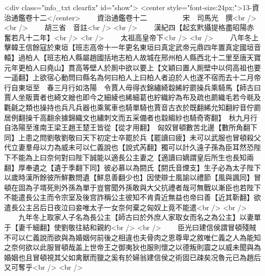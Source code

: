 <div class="info_txt clearfix" id="show">
<center style="font-size:24px;">13-資治通鑑卷十二</center>
  　　資治通鑑卷十二　　　　　宋　司馬光　撰<br />
<br />
　　胡三省　音註<br />
<br />
　　漢紀四【起玄黓攝提格盡昭陽赤奮若凡十二年】<br />
<br />
　　太祖高皇帝下<br />
<br />
　　八年冬上擊韓王信餘寇於東垣【班志高帝十一年更名東垣曰真定武帝元鼎四年置真定國垣音轅】過柏人【班志柏人縣屬趙國括地志柏人故城在邢州柏人縣西北十二里至唐天寶元年更柏人曰堯山】貫高等壁人於厠中欲以要上【文穎曰置人厠壁中以伺高祖也要一遥翻】上欲宿心動問曰縣名為何曰柏人上曰柏人者迫於人也遂不宿而去十二月帝行自東垣至　春三月行如洛陽　令賈人毋得衣錦繡綺縠絺紵罽操兵乘騎馬【師古曰賈人坐販賣者也綺文繒也即今之細綾也絺細葛也紵織紵為布及疏也罽織毛若今毼及氍毹之類也操持也兵凡兵器也乘駕車也騎單騎也賈音古衣於既翻絺允知翻紵音佇罽居例翻操千高翻余據錦織文也繡刺文而五采備者也縠縐紗也騎奇寄翻】　秋九月行自洛陽至淮南王梁王趙王楚王皆從【從才用翻】　匈奴冒頓數苦北邊【數所角翻下同】上患之問劉敬劉敬曰天下初定士卒罷於兵【罷讀曰疲】未可以武服也冒頓殺父代立妻羣母以力為威未可以仁義說也【說式芮翻】獨可以計久遠子孫為臣耳然恐陛下不能為上曰奈何對曰陛下誠能以適長公主妻之【適讀曰嫡謂皇后所生也長知兩翻】厚奉遺之【遺于季翻下同】彼必慕以為閼氏【閼氏音煙支】生子必為太子陛下以歲時漢所餘彼所鮮數問遺【鮮息善翻少也】因使辯士風諭以禮節【風與諷同】冒頓在固為子壻死則外孫為單于豈嘗聞外孫敢與大父抗禮者哉可無戰以漸臣也若陛下不能遣長公主而令宗室及後宫詐稱公主彼知不肯貴近無益也帝曰善【近其靳翻】欲遣長公主呂后日夜泣曰妾唯太子一女奈何棄之匈奴上竟不能遣<br />
<br />
　　九年冬上取家人子名為長公主【師古曰於外庶人家取女而名之為公主】以妻單于【妻千細翻】使劉敬往結和親約<br />
<br />
　　臣光曰建信侯謂冒頓殘賊不可以仁義說而欲與為婚姻何前後之相違也夫骨肉之恩尊卑之敘唯仁義之人為能知之奈何欲以此服冒頓哉盖上世帝王之御夷狄也服則懷之以德叛則震之以威未聞與為婚姻也且冒頓視其父如禽獸而獵之奚有於婦翁建信侯之術固已疎矣况魯元已為趙后又可奪乎<br />
<br />
